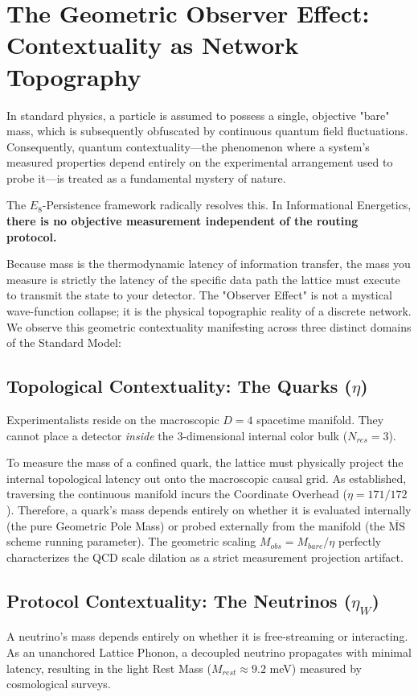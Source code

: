 \section{The Geometric Observer Effect: Contextuality as Network Topography}
\label{sec:observer_effect}

In standard physics, a particle is assumed to possess a single, objective "bare" mass, which is subsequently obfuscated by continuous quantum field fluctuations. Consequently, quantum contextuality—the phenomenon where a system's measured properties depend entirely on the experimental arrangement used to probe it—is treated as a fundamental mystery of nature.

The $E_8$-Persistence framework radically resolves this. In Informational Energetics, \textbf{there is no objective measurement independent of the routing protocol.} 

Because mass is the thermodynamic latency of information transfer, the mass you measure is strictly the latency of the specific data path the lattice must execute to transmit the state to your detector. The "Observer Effect" is not a mystical wave-function collapse; it is the physical topographic reality of a discrete network. We observe this geometric contextuality manifesting across three distinct domains of the Standard Model:

\subsection{Topological Contextuality: The Quarks ($\eta$)}
Experimentalists reside on the macroscopic $D=4$ spacetime manifold. They cannot place a detector \textit{inside} the 3-dimensional internal color bulk ($N_{res}=3$). 

To measure the mass of a confined quark, the lattice must physically project the internal topological latency out onto the macroscopic causal grid. As established, traversing the continuous manifold incurs the Coordinate Overhead ($\eta = 171/172$). Therefore, a quark's mass depends entirely on whether it is evaluated internally (the pure Geometric Pole Mass) or probed externally from the manifold (the $\overline{\text{MS}}$ scheme running parameter). The geometric scaling $M_{obs} = M_{bare} / \eta$ perfectly characterizes the QCD scale dilation as a strict measurement projection artifact.

\subsection{Protocol Contextuality: The Neutrinos ($\eta_W$)}
A neutrino's mass depends entirely on whether it is free-streaming or interacting. 
As an unanchored Lattice Phonon, a decoupled neutrino propagates with minimal latency, resulting in the light Rest Mass ($M_{rest} \approx 9.2$ meV) measured by cosmological surveys. 

